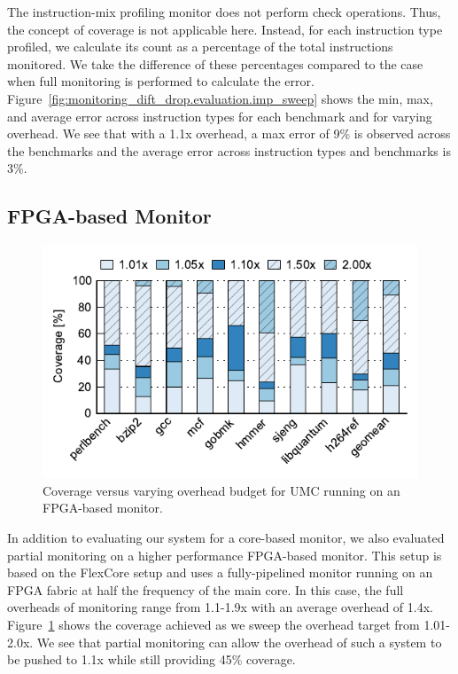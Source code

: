 The instruction-mix profiling monitor does not perform check operations. Thus,
the concept of coverage is not applicable here. Instead, for each instruction
type profiled, we calculate its count as a percentage of the total instructions
monitored. We take the difference of these percentages compared to the case
when full monitoring is performed to calculate the error.
Figure~\ref{fig:monitoring_dift_drop.evaluation.imp_sweep} shows the min, max,
and average error across instruction types for each benchmark and for varying
overhead. We see that with a 1.1x overhead, a max error of 9\% is observed
across the benchmarks and the average error across instruction types and
benchmarks is 3\%. 

\subsection{FPGA-based Monitor}
\label{sec:monitoring_dift_drop.evaluation.fpga}

\begin{figure}
  \begin{center}
    \includegraphics{monitoring_dift_drop/data/fpga_umc_sweep.pdf}
    \caption{Coverage versus varying overhead budget for UMC running on an FPGA-based monitor.}
    \label{fig:monitoring_dift_drop.evaluation.fpga_umc_sweep}
  \end{center}
\end{figure}

In addition to evaluating our system for a core-based monitor, we also
evaluated partial monitoring on a higher performance FPGA-based monitor. This
setup is based on the FlexCore \cite{flexcore-micro10} setup and uses a
fully-pipelined monitor running on an FPGA fabric at half the frequency of the
main core. In this case, the full overheads of monitoring
range from 1.1-1.9x with an average overhead of 1.4x.
Figure~\ref{fig:monitoring_dift_drop.evaluation.fpga_umc_sweep} shows the
coverage achieved as we sweep the overhead target from 1.01-2.0x. We see that
partial monitoring can allow the overhead of such a system to be pushed to 1.1x
while still providing 45\% coverage.


